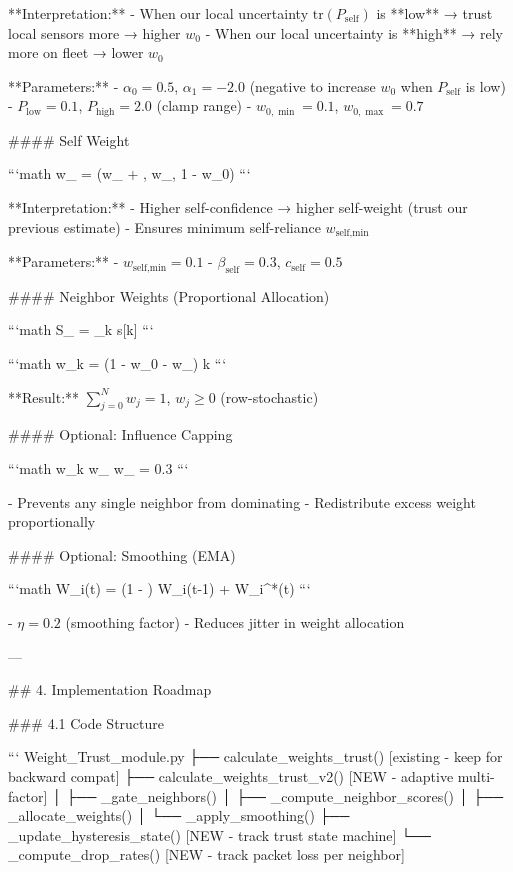 **Interpretation:**
- When our local uncertainty \(\text{tr}(P_{\text{self}})\) is **low** → trust local sensors more → higher \(w_0\)
- When our local uncertainty is **high** → rely more on fleet → lower \(w_0\)

**Parameters:**
- \(\alpha_0 = 0.5\), \(\alpha_1 = -2.0\) (negative to increase \(w_0\) when \(P_{\text{self}}\) is low)
- \(P_{\text{low}} = 0.1\), \(P_{\text{high}} = 2.0\) (clamp range)
- \(w_{0,\min} = 0.1\), \(w_{0,\max} = 0.7\)

#### Self Weight

```math
w_{} = \left(w_{} + , w_{}, 1 - w_0\right)
```

**Interpretation:**
- Higher self-confidence → higher self-weight (trust our previous estimate)
- Ensures minimum self-reliance \(w_{\text{self,min}}\)

**Parameters:**
- \(w_{\text{self,min}} = 0.1\)
- \(\beta_{\text{self}} = 0.3\), \(c_{\text{self}} = 0.5\)

#### Neighbor Weights (Proportional Allocation)

```math
S_{} = \sum_{k \in {}} s[k]
```

```math
w_k = (1 - w_0 - w_{}) \cdot {} \quad {} k \in {}
```

**Result:** \(\sum_{j=0}^N w_j = 1\), \(w_j \geq 0\) (row-stochastic)

#### Optional: Influence Capping

```math
w_k \leq w_{} \quad {} w_{} = 0.3\text{)}
```

- Prevents any single neighbor from dominating
- Redistribute excess weight proportionally

#### Optional: Smoothing (EMA)

```math
W_i(t) = (1 - \eta) \cdot W_i(t-1) + \eta \cdot W_i^*(t)
```

- \(\eta = 0.2\) (smoothing factor)
- Reduces jitter in weight allocation

---

## 4. Implementation Roadmap

### 4.1 Code Structure

```
Weight_Trust_module.py
├── calculate_weights_trust()          [existing - keep for backward compat]
├── calculate_weights_trust_v2()       [NEW - adaptive multi-factor]
│   ├── _gate_neighbors()
│   ├── _compute_neighbor_scores()
│   ├── _allocate_weights()
│   └── _apply_smoothing()
├── _update_hysteresis_state()         [NEW - track trust state machine]
└── _compute_drop_rates()              [NEW - track packet loss per neighbor]

